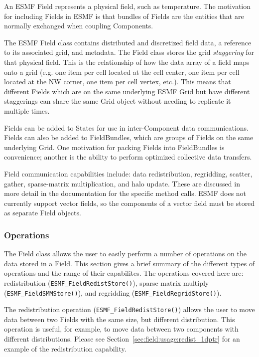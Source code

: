 
An ESMF Field represents a physical field, such as temperature.
The motivation for including Fields in ESMF is that bundles of 
Fields are the entities that are normally exchanged when coupling
Components.  

The ESMF Field class contains distributed and discretized field data, a reference 
to its associated grid, and metadata.  The Field class stores the grid {\it staggering}
for that physical field.
This is the relationship of how the data array of a field maps onto a grid 
(e.g. one item per
cell located at the cell center, one item per cell located at the NW
corner,  one item per cell vertex, etc.).  This means that different Fields
which are on the same underlying ESMF Grid but have different
staggerings can share the same Grid object without needing to replicate
it multiple times. 

Fields can be added to States for use in inter-Component
data communications.  Fields can also be added to FieldBundles,
which are groups of Fields on the same underlying Grid.  
One motivation for packing Fields into FieldBundles is convenience; 
another is the ability to perform optimized collective data transfers.  

Field communication capabilities include: data redistribution, regridding, scatter,
gather, sparse-matrix multiplication, and halo update.  These are discussed
in more detail in the documentation for the specific method calls.  
ESMF does not currently support vector fields, so the components of 
a vector field must be stored as separate Field objects.  

\subsubsection{Operations}

The Field class allows the user to easily perform a number of operations on 
the data stored in a Field. This section gives a brief summary of the different types of operations
and the range of their capabilites. The operations covered here are: redistribution ({\tt ESMF\_FieldRedistStore()}), sparse matrix multiply ({\tt ESMF\_FieldSMMStore()}), and regridding ({\tt ESMF\_FieldRegridStore()}).

The redistribution operation ({\tt ESMF\_FieldRedistStore()}) allows the user to move data between two Fields with the same size, but different 
distribution. This operation is useful, for example, to move data between two components with different distributions. 
Please see Section~\ref{sec:field:usage:redist_1dptr} for an example of the redistribution capability.

